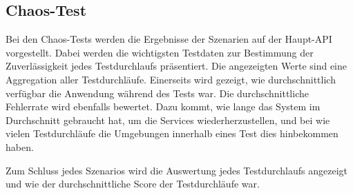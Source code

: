 \subsection{Chaos-Test}
Bei den Chaos-Tests werden die Ergebnisse der Szenarien auf der Haupt-API vorgestellt.
Dabei werden die wichtigsten Testdaten zur Bestimmung der Zuverlässigkeit jedes Testdurchlaufs präsentiert.
Die angezeigten Werte sind eine Aggregation aller Testdurchläufe.
Einerseits wird gezeigt, wie durchschnittlich verfügbar die Anwendung während des Tests war.
Die durchschnittliche Fehlerrate wird ebenfalls bewertet.
Dazu kommt, wie lange das System im Durchschnitt gebraucht hat, um die Services wiederherzustellen, und bei wie vielen Testdurchläufe die Umgebungen innerhalb eines Test dies hinbekommen haben.

Zum Schluss jedes Szenarios wird die Auswertung jedes Testdurchlaufs angezeigt und wie der durchschnittliche Score der Testdurchläufe war.



